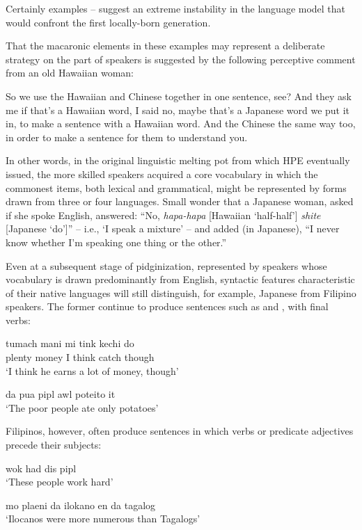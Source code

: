 Certainly examples -- suggest an extreme instability in the language model that would confront the first locally-born generation.

That the macaronic elements in these examples may represent a deliber\-ate strategy on the part of speakers is suggested by the following perceptive comment from an old Hawaiian woman:

\ea\label{ex:5}
 So we use the Hawaiian and Chinese together in one sentence, see? And they ask me if that's a Hawaiian word, I said no, maybe that's a Japanese word we put it in, to make a sentence with a Hawaiian word. And the Chinese the same way too, in order to make a sentence for them to understand you.
\z

\noindent In other words, in the original linguistic melting pot from which HPE eventually issued, the more skilled speakers acquired a core vocabulary in which the commonest items, both lexical and grammatical, might be represented by forms drawn from three or four languages. Small wonder that a Japanese woman, asked if she spoke English, answered: ``No, \textit{hapa-hapa} [Hawaiian `half-half'] \textit{shite} [Japanese `do']'' -- i.e., `I speak a mixture' -- and added (in Japanese), ``I never know whether I'm speaking one thing or the other.''

Even at a subsequent stage of pidginization, represented by speakers whose vocabulary is drawn predominantly from English, syntactic features characteristic of their native languages will still distinguish, for example, Japanese from Filipino speakers. The former continue to produce sentences such as  and , with final verbs:

\ea\label{ex:6}
\gll tumach mani mi tink kechi do\\
 plenty money I think catch though\\
\glt  `I think he earns a lot of money, though'
\z

\ea\label{ex:7}
da pua pipl awl poteito it \\
\glt `The poor people ate only potatoes'
\z

\noindent Filipinos, however, often produce sentences in which verbs or predicate adjectives precede their subjects:

\ea\label{ex:8}
 wok had dis pipl\\
\glt  `These people work hard'
\z

\ea\label{ex:9}
mo plaeni da ilokano en da tagalog\\
\glt  `Ilocanos were more numerous than Tagalogs'
\z

